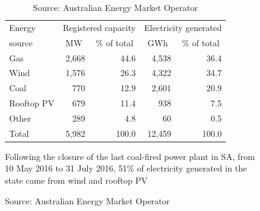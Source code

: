 \documentclass[handout, smaller, xcolor=table]{beamer}			%
\begin{document}
\begin{frame}
\begin{figure}[!h]
\begin{minipage}{0.50\linewidth}
\begin{table}[!h]
{\begin{tabular}{l r r r r}
			\toprule
			Energy	& \multicolumn{2}{c}{Registered capacity}	& \multicolumn{2}{c}{Electricity generated} \\
			source	& \multicolumn{1}{c}{MW}	& \multicolumn{1}{c}{\% of total}	&  \multicolumn{1}{c}{GWh}	& \multicolumn{1}{c}{\% of total}	\\
			\midrule
			Gas			& 2,668	& 44.6	& 4,538	& 36.4	\\
			Wind			& 1,576	& 26.3	& 4,322	& 34.7	\\
			Coal			& 770	& 12.9	& 2,601	& 20.9	\\
			Rooftop PV	& 679	& 11.4	& 938	& 7.5		\\
			Other		& 289	& 4.8		& 60		& 0.5		\\
			\midrule
			Total			& 5,982	& 100.0	& 12,459	& 100.0	\\
			\bottomrule
			\end{tabular}	
    		}
		\caption{Source: Australian Energy Market Operator}
		\end{table}
		
		{\footnotesize Following the closure of the last coal-fired power plant in SA, from 10 May 2016 to 31 July 2016, 51\% of electricity generated in the state came from wind and rooftop PV\par}
	\end{minipage}
\end{figure}

\end{frame}
\end{document}
